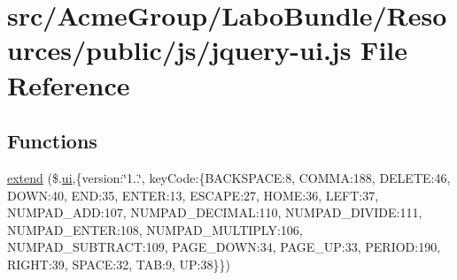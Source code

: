 \hypertarget{jquery-ui_8js}{\section{src/\+Acme\+Group/\+Labo\+Bundle/\+Resources/public/js/jquery-\/ui.js File Reference}
\label{jquery-ui_8js}
}
\subsection*{Functions}
\begin{DoxyCompactItemize}
\item 
\hyperlink{jquery-ui_8js_aef57b5ae787ae191fbfbb0e4016ed46b}{extend} (\$.\hyperlink{jquery-ui_8js_ac492f8de2d00b6c4282e766bfadaf2e7}{ui},\{version\+:\char`\"{}1..\char`\"{}, key\+Code\+:\{B\+A\+C\+K\+S\+P\+A\+C\+E\+:8, C\+O\+M\+M\+A\+:188, D\+E\+L\+E\+T\+E\+:46, D\+O\+W\+N\+:40, E\+N\+D\+:35, E\+N\+T\+E\+R\+:13, E\+S\+C\+A\+P\+E\+:27, H\+O\+M\+E\+:36, L\+E\+F\+T\+:37, N\+U\+M\+P\+A\+D\+\_\+\+A\+D\+D\+:107, N\+U\+M\+P\+A\+D\+\_\+\+D\+E\+C\+I\+M\+A\+L\+:110, N\+U\+M\+P\+A\+D\+\_\+\+D\+I\+V\+I\+D\+E\+:111, N\+U\+M\+P\+A\+D\+\_\+\+E\+N\+T\+E\+R\+:108, N\+U\+M\+P\+A\+D\+\_\+\+M\+U\+L\+T\+I\+P\+L\+Y\+:106, N\+U\+M\+P\+A\+D\+\_\+\+S\+U\+B\+T\+R\+A\+C\+T\+:109, P\+A\+G\+E\+\_\+\+D\+O\+W\+N\+:34, P\+A\+G\+E\+\_\+\+U\+P\+:33, P\+E\+R\+I\+O\+D\+:190, R\+I\+G\+H\+T\+:39, S\+P\+A\+C\+E\+:32, T\+A\+B\+:9, U\+P\+:38\}\})
\item 

\end{DoxyCompactItemize}
